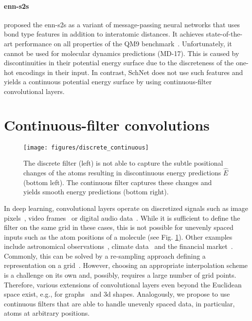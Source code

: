 \documentclass{article}
\begin{document}
\paragraph*{enn-s2s} \citet{gilmer2017neural} proposed the enn-s2s as a variant of message-passing neural networks that uses bond type features in addition to interatomic distances.
It achieves state-of-the-art performance on all properties of the QM9 benchmark~\citep{gilmer2017neural}.
Unfortunately, it cannot be used for molecular dynamics predictions (MD-17).
This is caused by discontinuities in their potential energy surface due to the discreteness of the one-hot encodings in their input. 
In contrast, SchNet does not use such features and yields a continuous potential energy surface by using continuous-filter convolutional layers.

\section{Continuous-filter convolutions}
\begin{figure}
\centering
\texttt{[image: figures/discrete\_continuous]}
\caption{The discrete filter (left) is not able to capture the subtle positional changes of the atoms resulting in discontinuous energy predictions $\hat{E}$ (bottom left). The continuous filter captures these changes and yields smooth energy predictions (bottom right).}
\label{fig:discrete}
\end{figure}
In deep learning, convolutional layers operate on discretized signals such as image pixels~\citep{lecun1989backpropagation, krizhevsky2012imagenet}, video frames~\citep{karpathy2014large} or digital audio data~\citep{van2016wavenet}.
While it is sufficient to define the filter on the same grid in these cases, this is not possible for unevenly spaced inputs such as the atom positions of a molecule (see Fig. \ref{fig:discrete}).
Other examples include astronomical observations~\citep{max2014method}, climate data~\citep{olafsdottir2016redfit} and the financial market~\citep{nieto2015bayesian}.
Commonly, this can be solved by a re-sampling approach defining a representation on a grid~\citep{snyder2012finding,hirn2017wavelet,brockherde2017bypassing}.
However, choosing an appropriate interpolation scheme is a challenge on its own and, possibly, requires a large number of grid points.
Therefore, various extensions of convolutional layers even beyond the Euclidean space exist, e.g., for graphs~\citep{BrunaZSL13,HenaffBL15} and 3d shapes\citep{masci2015geodesic}.
Analogously, we propose to use continuous filters that are able to handle unevenly spaced data, in particular, atoms at arbitrary positions.
\end{document}
